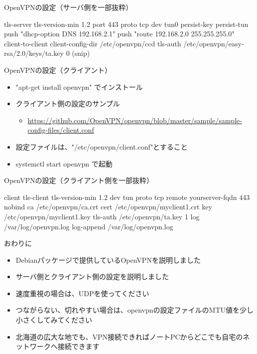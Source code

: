 \begin{frame}[containsverbatim]{OpenVPNの設定（サーバ側を一部抜粋）}
\begin{commandline}
tls-server
tls-version-min 1.2
port 443
proto tcp
dev tun0
persist-key
persist-tun
push "dhcp-option DNS 192.168.2.1"
push "route 192.168.2.0 255.255.255.0"
client-to-client
client-config-dir /etc/openvpn/ccd
tls-auth /etc/openvpn/easy-rsa/2.0/keys/ta.key 0
  (snip)
\end{commandline}
\end{frame}


\begin{frame}[containsverbatim]{OpenVPNの設定（クライアント）}
  \begin{itemize}
  \item "apt-get install openvpn" でインストール
  \item クライアント側の設定のサンプル
  \begin{itemize}
  \item \url{https://github.com/OpenVPN/openvpn/blob/master/sample/sample-config-files/client.conf}
  \end{itemize}
  \item 設定ファイルは、"/etc/openvpn/client.conf"とすること
  \item systemctl start openvpn で起動
  \end{itemize}
\end{frame}

\begin{frame}[containsverbatim]{OpenVPNの設定（クライアント側を一部抜粋）}
\begin{commandline}
client
tls-client
tls-version-min 1.2
dev tun
proto tcp
remote yourserver-fqdn 443
nobind
ca /etc/openvpn/ca.crt
cert /etc/openvpn/myclient1.crt
key /etc/openvpn/myclient1.key
tls-auth /etc/openvpn/ta.key 1
log /var/log/openvpn.log
log-append /var/log/openvpn.log
\end{commandline}
\end{frame}

\begin{frame}[containsverbatim]{おわりに}
  \begin{itemize}
  \item Debianパッケージで提供しているOpenVPNを説明しました
  \item サーバ側とクライアント側の設定を説明しました
  \item 速度重視の場合は、UDPを使ってください
  \item つながらない、切れやすい場合は、openvpnの設定ファイルのMTU値を少し小さくしてみてください
  \item 北海道の広大な地でも、VPN接続できればノートPCからどこでも自宅のネットワークへ接続できます
  \end{itemize}
\end{frame}


